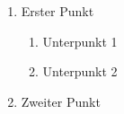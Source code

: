 
\begin{enumerate}
    \item Erster Punkt
      \begin{enumerate}
        \item Unterpunkt 1
        \item Unterpunkt 2
      \end{enumerate}
    \item Zweiter Punkt
\end{enumerate}

\newpage